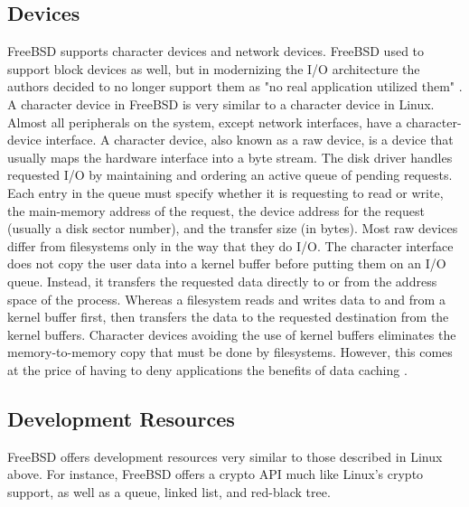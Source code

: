 \documentclass[onecolumn,draftclsnofoot, 10pt, compsoc]{IEEEtran}
\begin{document}
		\subsection{Devices}
			FreeBSD supports character devices and network devices.
			FreeBSD used to support block devices as well, but in modernizing the I/O architecture the authors decided to no longer support them as "no real application utilized them" \cite{freeBSDSmall}.
			A character device in FreeBSD is very similar to a character device in Linux.
			Almost all peripherals on the system, except network interfaces, have a character-device interface. 
			A character device, also known as a raw device, is a device that usually maps the hardware interface into a byte stream.
			The disk driver handles requested I/O by maintaining and ordering an active queue of pending requests. 
			Each entry in the queue must specify whether it is requesting to read or write, the main-memory address of the request, the device address for the request (usually a disk sector number), and the transfer size (in bytes).
			Most raw devices differ from filesystems only in the way that they do I/O. 
			The character interface does not copy the user data into a kernel buffer before putting them on an I/O queue. Instead, it transfers the requested data directly to or from the address space of the process.
			Whereas a filesystem reads and writes data to and from a kernel buffer first, then transfers the data to the requested destination from the kernel buffers. 
			Character devices avoiding the use of kernel buffers eliminates the memory-to-memory copy that must be done by filesystems.
			However, this comes at the price of having to deny applications the benefits of data caching \cite{freeBSDDev}.
		
		\subsection{Development Resources}
			FreeBSD offers development resources very similar to those described in Linux above.
			For instance, FreeBSD offers a crypto API much like Linux's crypto support, as well as a queue, linked list, and red-black tree.
\end{document}
